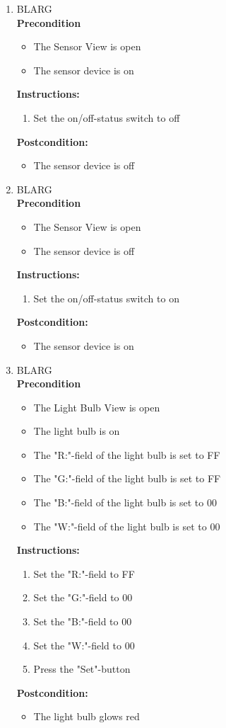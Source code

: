 \documentclass[a4paper]{article}
\newlength{\testlabellength}
\newenvironment{testlist}{\begin{enumerate}[label=\bfseries Instruction \thesubsection.\arabic* , labelindent=0pt, labelwidth=\testlabellength , leftmargin=2cm]}{\end{enumerate}}
\newenvironment{precondition}{
{\color{white}BLARG}\\ 
\textbf{Precondition}
\begin{itemize}[labelindent=0cm, labelwidth=2cm , leftmargin=1cm]
}
{\end{itemize}}
\newenvironment{instruction}{
\textbf{Instructions:}
\begin{enumerate}[label=\bfseries  \arabic*., labelindent=0cm, labelwidth=2cm , leftmargin=1cm]
}
{\end{enumerate}}
\newenvironment{postcondition}{
\textbf{Postcondition:}
\begin{itemize}[labelindent=0cm, labelwidth=2cm , leftmargin=1cm]
}
{\end{itemize}}
\begin{document}
\begin{appendices}
\begin{testlist}
	\item
		\begin{precondition}
			\item The Sensor View is open
			\item The sensor device is on
		\end{precondition}
		\begin{instruction}
			\item Set the on/off-status switch to off
		\end{instruction}
		\begin{postcondition}
			\item The sensor device is off
		\end{postcondition}

	\item
		\begin{precondition}
			\item The Sensor View is open
			\item The sensor device is off
		\end{precondition}
		\begin{instruction}
			\item Set the on/off-status switch to on
		\end{instruction}
		\begin{postcondition}
			\item The sensor device is on
		\end{postcondition}

	\item
		\begin{precondition}
			\item The Light Bulb View is open
			\item The light bulb is on
			\item The "R:"-field of the light bulb is set to FF
			\item The "G:"-field of the light bulb is set to FF
			\item The "B:"-field of the light bulb is set to 00
			\item The "W:"-field of the light bulb is set to 00
		\end{precondition}
		\begin{instruction}
			\item Set the "R:"-field to FF
			\item Set the "G:"-field to 00
			\item Set the "B:"-field to 00
			\item Set the "W:"-field to 00
			\item Press the "Set"-button
		\end{instruction}
		\begin{postcondition}
			\item The light bulb glows red
		\end{postcondition}


\end{testlist}
\end{appendices}
\end{document}
